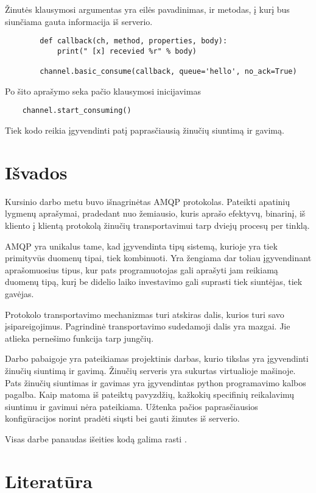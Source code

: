 \documentclass[12pt, a4paper, lithuanian]{article}
\begin{document}
    Žinutės klausymosi argumentas yra eilės pavadinimas, ir metodas, į kurį bus siunčiama gauta informacija iš serverio.

    \begin{lstlisting}
        def callback(ch, method, properties, body):
            print(" [x] recevied %r" % body)

        channel.basic_consume(callback, queue='hello', no_ack=True)
    \end{lstlisting}

    Po šito aprašymo seka pačio klausymosi inicijavimas

    \begin{lstlisting}
    channel.start_consuming()
    \end{lstlisting}

    Tiek kodo reikia įgyvendinti patį paprasčiausią žinučių siuntimą ir gavimą.

    \begin{figure}

        \label{img:producer_consumer_example}
    \end{figure}

    \section{Išvados}

    Kursinio darbo metu buvo išnagrinėtas AMQP protokolas. 
    Pateikti apatinių lygmenų aprašymai, pradedant nuo žemiausio, kuris aprašo efektyvų, binarinį, iš kliento į klientą protokolą žinučių transportavimui tarp dviejų procesų per tinklą.

    AMQP yra unikalus tame, kad įgyvendinta tipų sistemą, kurioje yra tiek primityvūs duomenų tipai, tiek kombinuoti.
    Yra žengiama dar toliau įgyvendinant aprašomuosius tipus, kur pats programuotojas gali aprašyti jam reikiamą duomenų tipą, kurį be didelio laiko investavimo gali suprasti tiek siuntėjas, tiek gavėjas.

    Protokolo transportavimo mechanizmas turi atskiras dalis, kurios turi savo įsipareigojimus. Pagrindinė transportavimo sudedamoji dalis yra mazgai.
    Jie atlieka pernešimo funkcija tarp jungčių.

    Darbo pabaigoje yra pateikiamas projektinis darbas, kurio tikslas yra įgyvendinti žinučių siuntimą ir gavimą. Žinučių serveris yra sukurtas virtualioje mašinoje.
    Pats žinučių siuntimas ir gavimas yra įgyvendintas python programavimo kalbos pagalba.
    Kaip matoma iš pateiktų pavyzdžių, kažkokių specifinių reikalavimų siuntimu ir gavimui nėra pateikiama.
    Užtenka pačios paprasčiausios konfigūracijos norint pradėti siųsti bei gauti žinutes iš serverio.

    Visas darbe panaudas išeities kodą galima rasti \cite{magistra14:online}.

    \newpage
    \section{Literatūra}

    
    
\end{document}
